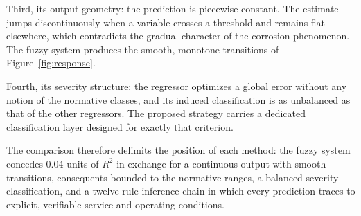 Third, its output geometry: the prediction is piecewise constant. The estimate jumps discontinuously when a variable crosses a threshold and remains flat elsewhere, which contradicts the gradual character of the corrosion phenomenon. The fuzzy system produces the smooth, monotone transitions of Figure~\ref{fig:response}.

Fourth, its severity structure: the regressor optimizes a global error without any notion of the normative classes, and its induced classification is as unbalanced as that of the other regressors. The proposed strategy carries a dedicated classification layer designed for exactly that criterion.

The comparison therefore delimits the position of each method: the fuzzy system concedes 0.04 units of $R^2$ in exchange for a continuous output with smooth transitions, consequents bounded to the normative ranges, a balanced severity classification, and a twelve-rule inference chain in which every prediction traces to explicit, verifiable service and operating conditions.
